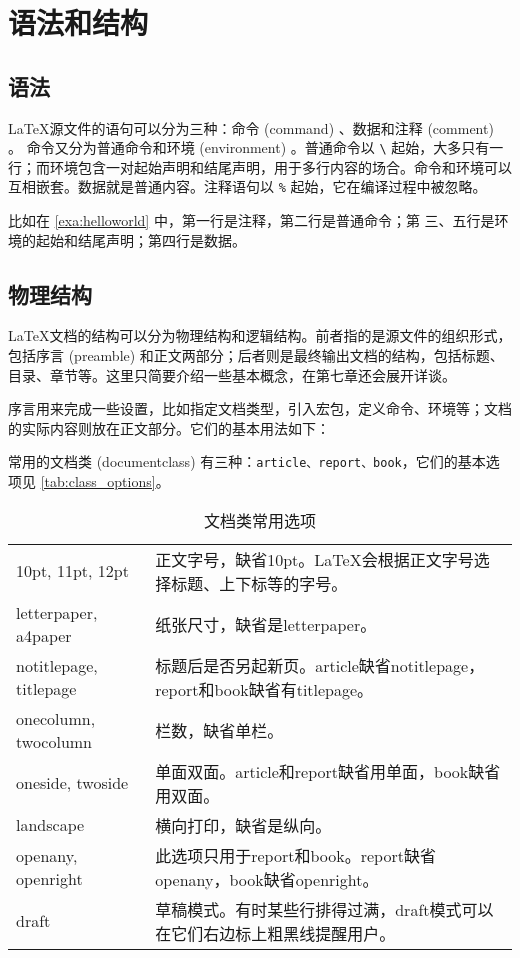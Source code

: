 \section{语法和结构}\label{sec:structure}

\subsection{语法}

\LaTeX 源文件的语句可以分为三种：命令 (command) 、数据和注释 (comment) 。
命令又分为普通命令和环境 (environment) 。普通命令以 \verb|\| 起始，大多只有一行；而环境包含一对起始声明和结尾声明，用于多行内容的场合。命令和环境可以互相嵌套。数据就是普通内容。注释语句以 \verb|%| 起始，它在编译过程中被忽略。

比如在 \autoref{exa:helloworld} 中，第一行是注释，第二行是普通命令；第
三、五行是环境的起始和结尾声明；第四行是数据。

\subsection{物理结构}

\LaTeX 文档的结构可以分为物理结构和逻辑结构。前者指的是源文件的组织形式，包括序言 (preamble) 和正文两部分；后者则是最终输出文档的结构，包括标题、目录、章节等。这里只简要介绍一些基本概念，在第七章还会展开详谈。

序言用来完成一些设置，比如指定文档类型，引入宏包，定义命令、环境等；文档的实际内容则放在正文部分。它们的基本用法如下：


常用的文档类 (documentclass) 有三种：\texttt{article、report、book}，它们的基本选项见 \autoref{tab:class_options}。

\begin{table}[htbp]
\centering
\caption{文档类常用选项}
\label{tab:class_options}
\begin{tabularx}{350pt}{lX}
    \toprule
    10pt, 11pt, 12pt & 正文字号，缺省10pt。\LaTeX 会根据正文字号选择标题、上下标等的字号。\\
    letterpaper, a4paper & 纸张尺寸，缺省是letterpaper。\\
    notitlepage, titlepage & 标题后是否另起新页。article缺省notitlepage，report和book缺省有titlepage。\\
    onecolumn, twocolumn & 栏数，缺省单栏。\\
    oneside, twoside & 单面双面。article和report缺省用单面，book缺省用双面。\\
    landscape & 横向打印，缺省是纵向。\\
    openany, openright & 此选项只用于report和book。report缺省openany，book缺省openright。\\
    draft & 草稿模式。有时某些行排得过满，draft模式可以在它们右边标上粗黑线提醒用户。\\
    \bottomrule
\end{tabularx}
\end{table}

